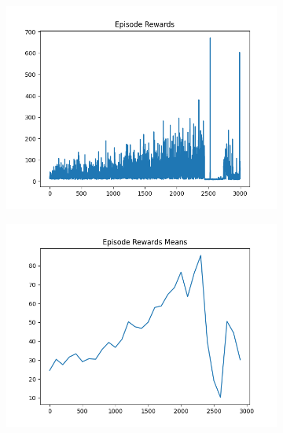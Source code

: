 \begin{figure}[H]
    \centering
    \begin{subfigure}{.47\linewidth}
        \centering
        \includegraphics[width=\textwidth]{pole/2024-06-13_18-50-05_dqn_cartpole_episode_rewards.png}
    \end{subfigure}
    \begin{subfigure}{.47\linewidth}
        \centering
        \includegraphics[width=\textwidth]{pole/2024-06-13_18-50-05_dqn_cartpole_episode_rewards_means.png}
    \end{subfigure}
    \begin{subfigure}{.47\linewidth}
        \centering

\end{subfigure}
\end{figure}
